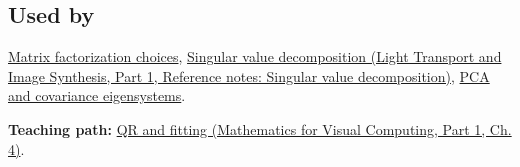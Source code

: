 \subsection{Used by}\label{appendix-c3421e6b4f2c-used-by}

\hypertarget{appendix-c3421e6b4f2c-used-by}{}

\hyperref[appendix-221a483bec2d]{Matrix factorization choices}, \href{../04-Light-Transport-and-Image-Synthesis-P01/main.pdf\#appendix-1fad5e7f36fa}{Singular value decomposition (Light Transport and Image Synthesis, Part 1, Reference notes: Singular value decomposition)}, \hyperref[appendix-ad175ef3c5bf]{PCA and covariance eigensystems}.

\textbf{Teaching path:} \href{../02-Mathematics-for-Visual-Computing-P01/main.pdf\#01-foundations-i-ch020-structure-makes-a-decomposition-a-better-tool-than-generic-elimination}{QR and fitting (Mathematics for Visual Computing, Part 1, Ch. 4)}.
